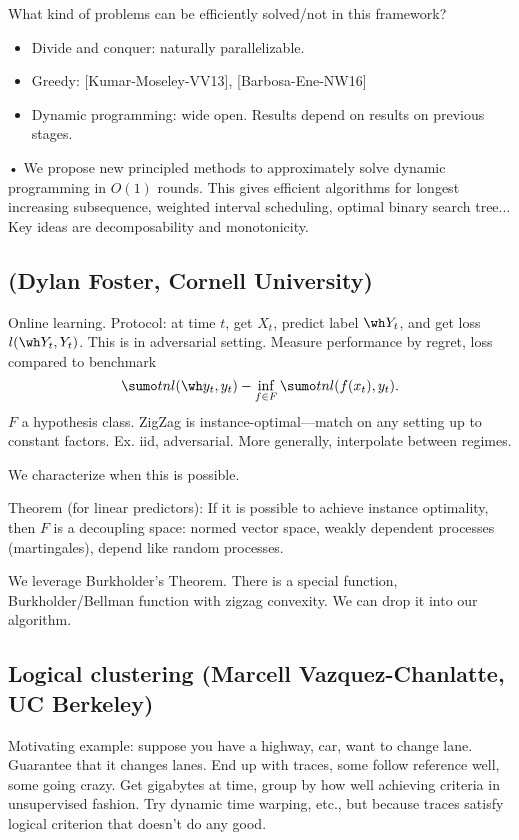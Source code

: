 What kind of problems can be efficiently solved/not in this framework?
\begin{itemize}
\item
Divide and conquer: naturally parallelizable.
\item
Greedy: [Kumar-Moseley-VV13], [Barbosa-Ene-NW16]
\item
Dynamic programming: wide open. Results depend on results on previous stages.
\end{itemize}•
We propose new principled methods to approximately solve dynamic programming in $O(1)$ rounds. This gives efficient algorithms for longest increasing subsequence, weighted interval scheduling, optimal binary search tree... Key ideas are decomposability and monotonicity.

\subsection{(Dylan Foster, Cornell University)}


Online learning. Protocol: at time $t$, get $X_t$, predict label $\wh Y_t$, and get loss $l(\wh Y_t, Y_t)$.  This is in adversarial setting.
Measure performance by regret, loss compared to benchmark
$$
\sumo tn l(\wh y_t, y_t) - \inf_{f\in F} \sumo tn l(f(x_t),y_t).
$$
$F$ a hypothesis class.
ZigZag is instance-optimal---match on any setting up to constant factors. Ex. iid, adversarial. More generally,  interpolate between regimes. 

We characterize when this is possible. 

Theorem (for linear predictors): If it is possible to achieve instance optimality, then $F$ is a decoupling space: normed vector space, weakly dependent processes (martingales), depend like random processes.

We leverage Burkholder's Theorem. There is a special function, Burkholder/Bellman function with zigzag convexity. We can drop it into our algorithm.

\subsection{Logical clustering (Marcell Vazquez-Chanlatte, UC Berkeley)}

Motivating example: suppose you have a highway, car,
want to change lane. Guarantee that it changes lanes. End up with traces, some follow reference well, some going crazy. Get gigabytes at time, group by how well achieving criteria in unsupervised fashion.
Try dynamic time warping, etc., but because traces satisfy logical criterion that doesn't do any good.

